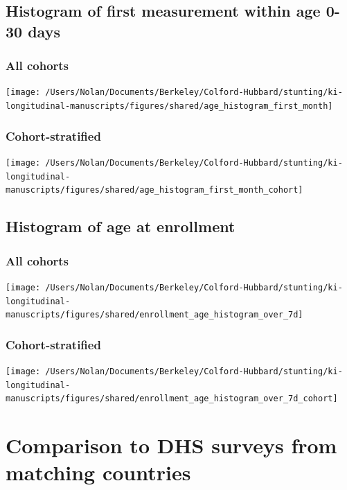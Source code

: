\documentclass[9pt,]{book}
\begin{document}
\section{Histogram of first measurement within age 0-30
days}\label{histogram-of-first-measurement-within-age-0-30-days}

\subsection{All cohorts}\label{all-cohorts}

\texttt{[image: /Users/Nolan/Documents/Berkeley/Colford-Hubbard/stunting/ki-longitudinal-manuscripts/figures/shared/age\_histogram\_first\_month]}

\subsection{Cohort-stratified}\label{cohort-stratified}

\texttt{[image: /Users/Nolan/Documents/Berkeley/Colford-Hubbard/stunting/ki-longitudinal-manuscripts/figures/shared/age\_histogram\_first\_month\_cohort]}

\section{Histogram of age at
enrollment}\label{histogram-of-age-at-enrollment}

\subsection{All cohorts}\label{all-cohorts-1}

\texttt{[image: /Users/Nolan/Documents/Berkeley/Colford-Hubbard/stunting/ki-longitudinal-manuscripts/figures/shared/enrollment\_age\_histogram\_over\_7d]}

\subsection{Cohort-stratified}\label{cohort-stratified-1}

\texttt{[image: /Users/Nolan/Documents/Berkeley/Colford-Hubbard/stunting/ki-longitudinal-manuscripts/figures/shared/enrollment\_age\_histogram\_over\_7d\_cohort]}

\chapter{Comparison to DHS surveys from matching countries}\label{DHS}
\end{document}
